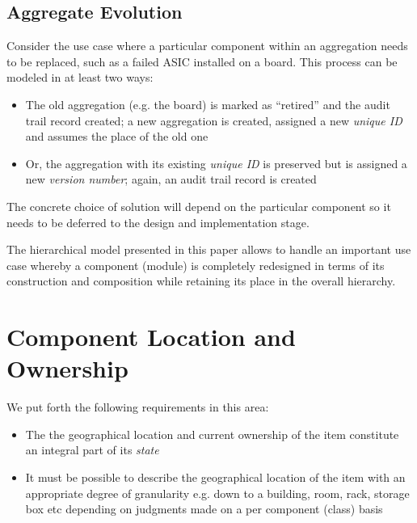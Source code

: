 \documentclass[pdftex,12pt,letter]{article}
\begin{document}
\subsection{Aggregate Evolution}
\label{evolution}
Consider the use case where a particular component within an aggregation needs to be replaced,
such as a failed ASIC installed on a board. This process can be modeled in at least two ways:

\begin{itemize}

\item The old aggregation (e.g. the board) is marked as ``retired'' and the audit trail record created; a new aggregation is
created, assigned a new \textit{unique ID} and assumes the place of the old one

\item Or, the aggregation with its existing \textit{unique ID} is preserved but is assigned a new \textit{version number};
again, an audit trail record is created

\end{itemize}

\noindent The concrete choice of solution will depend on the particular component so it needs to be deferred to the
design and implementation stage.

The hierarchical model presented in this paper allows to handle an important use case whereby a component (module)
is completely redesigned in terms of its construction and composition while retaining its place in the overall hierarchy.

\section{Component Location and Ownership}

We put forth the following requirements in this area:
\begin{itemize}

\item The  the geographical location and current ownership of the item constitute an integral part of its \textit{state}

\item It must be possible to describe the geographical location of the item with an appropriate degree of granularity e.g. down to a building,
room, rack, storage box etc depending on judgments made on a per component (class) basis


\end{itemize}
\end{document}
